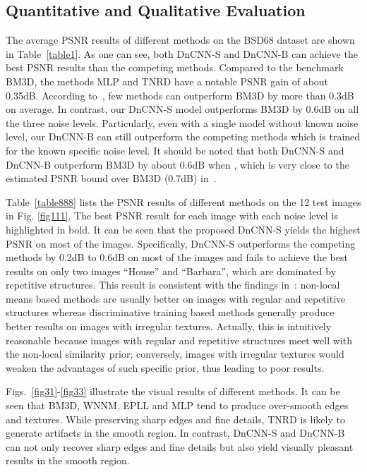 \documentclass[journal]{IEEEtran}
\begin{document}
\subsection{Quantitative and Qualitative Evaluation}

The average PSNR results of different methods on the BSD68 dataset are shown in Table~\ref{table1}.
As one can see, both DnCNN-S and DnCNN-B can achieve the best PSNR results than the competing methods.
Compared to the benchmark BM3D, the methods MLP and TNRD have a notable PSNR gain of about 0.35dB.
According to~\cite{levin2011natural,levin2012patch}, few methods can outperform BM3D by more than 0.3dB on average. In contrast, our DnCNN-S model outperforms BM3D by 0.6dB on all the three noise levels. Particularly, even with a single model without known noise level, our DnCNN-B can still outperform the competing methods which is trained for the known specific noise level.
It should be noted that both DnCNN-S and DnCNN-B outperform BM3D by about 0.6dB when , which is very close to the estimated PSNR bound over BM3D (0.7dB) in~\cite{levin2012patch}.


Table~\ref{table888} lists the PSNR results of different methods on the 12 test images in Fig. \ref{fig111}. The best PSNR result for each image with each noise level is highlighted in bold.
It can be seen that the proposed DnCNN-S yields the highest PSNR on most of the images. Specifically, DnCNN-S outperforms the competing methods by 0.2dB to 0.6dB on most of the images and fails to achieve the best results on only two images ``House'' and ``Barbara'', which are dominated by repetitive structures.
This result is consistent with the findings in~\cite{burger2013learning}: non-local means based methods are usually better on images with regular and repetitive structures whereas discriminative training based methods generally produce better results on images with irregular textures. Actually, this is intuitively reasonable because images with regular and repetitive structures meet well with the non-local similarity prior; conversely, images with irregular textures would weaken the advantages of such specific prior, thus leading to poor results.


Figs.~\ref{fig31}-\ref{fig33} illustrate the visual results of different methods.
It can be seen that BM3D, WNNM, EPLL and MLP tend to produce over-smooth edges and textures.
While preserving sharp edges and fine details, TNRD is likely to generate artifacts in the smooth region.
In contrast, DnCNN-S and DnCNN-B can not only recover sharp edges and fine details but also yield visually pleasant results in the smooth region.
\end{document}
